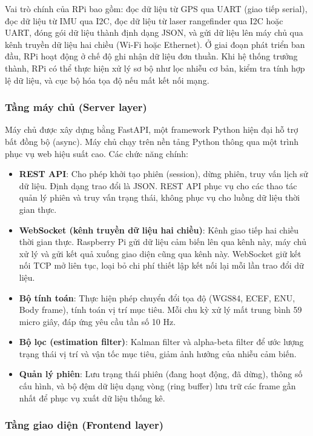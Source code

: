 Vai trò chính của RPi bao gồm: đọc dữ liệu từ GPS qua UART (giao tiếp serial), đọc dữ liệu từ IMU qua I2C, đọc dữ liệu từ laser rangefinder qua I2C hoặc UART, đóng gói dữ liệu thành định dạng JSON, và gửi dữ liệu lên máy chủ qua kênh truyền dữ liệu hai chiều (Wi-Fi hoặc Ethernet). Ở giai đoạn phát triển ban đầu, RPi hoạt động ở chế độ ghi nhận dữ liệu đơn thuần. Khi hệ thống trưởng thành, RPi có thể thực hiện xử lý sơ bộ như lọc nhiễu cơ bản, kiểm tra tính hợp lệ dữ liệu, và cục bộ hóa tọa độ nếu mất kết nối mạng.

\subsubsection{Tầng máy chủ (Server layer)}

\hspace{0.5cm} Máy chủ được xây dựng bằng FastAPI, một framework Python hiện đại hỗ trợ bất đồng bộ (async). Máy chủ chạy trên nền tảng Python thông qua một trình phục vụ web hiệu suất cao. Các chức năng chính:

\begin{itemize}
    \item \textbf{REST API}: Cho phép khởi tạo phiên (session), dừng phiên, truy vấn lịch sử dữ liệu. Định dạng trao đổi là JSON. REST API phục vụ cho các thao tác quản lý phiên và truy vấn trạng thái, không phục vụ cho luồng dữ liệu thời gian thực.
    \item \textbf{WebSocket (kênh truyền dữ liệu hai chiều)}: Kênh giao tiếp hai chiều thời gian thực. Raspberry Pi gửi dữ liệu cảm biến lên qua kênh này, máy chủ xử lý và gửi kết quả xuống giao diện cũng qua kênh này. WebSocket giữ kết nối TCP mở liên tục, loại bỏ chi phí thiết lập kết nối lại mỗi lần trao đổi dữ liệu.
    \item \textbf{Bộ tính toán}: Thực hiện phép chuyển đổi tọa độ (WGS84, ECEF, ENU, Body frame), tính toán vị trí mục tiêu. Mỗi chu kỳ xử lý mất trung bình 59 micro giây, đáp ứng yêu cầu tần số 10 Hz.
    \item \textbf{Bộ lọc (estimation filter)}: Kalman filter và alpha-beta filter để ước lượng trạng thái vị trí và vận tốc mục tiêu, giảm ảnh hưởng của nhiễu cảm biến.
    \item \textbf{Quản lý phiên}: Lưu trạng thái phiên (đang hoạt động, đã dừng), thông số cấu hình, và bộ đệm dữ liệu dạng vòng (ring buffer) lưu trữ các frame gần nhất để phục vụ xuất dữ liệu thống kê.
\end{itemize}

\subsubsection{Tầng giao diện (Frontend layer)}

